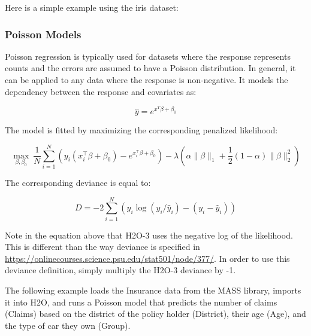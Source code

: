 Here is a simple example using the iris dataset:


\waterExampleInR


\waterExampleInPython



\subsubsection{Poisson Models}
Poisson regression is typically used for datasets where the response represents counts and the errors are assumed to have a Poisson distribution. In general, it can be applied to any data where the response is non-negative. It models the dependency between the response and covariates as: 
\nowidow[3]

$$\hat{y} = e^{x^T\beta + \beta_0}$$

The model is fitted by maximizing the corresponding penalized likelihood:

$$  \max_{\beta,\beta_0}  \ \frac{1}{N} \sum_{i=1}^{N}  \left(   y_i (x_i^{\top}\beta  + \beta_0) - e^{x_i^{\top}\beta  + \beta_0} \right) 
- \lambda \left(\alpha \|\beta \|_1 + \frac{1}{2}(1-\alpha) \| \beta \|_2^2 \right)$$

The corresponding deviance is equal to: 

$$D = -2\sum_{i=1}^{N} \left( y_i \log(y_i/\hat{y}_i) - ( y_i - \hat{y}_i  ) \right)$$

Note in the equation above that H2O-3 uses the negative log of the likelihood. This is different than the way deviance is specified in \url{https://onlinecourses.science.psu.edu/stat501/node/377/}. In order to use this deviance definition, simply multiply the H2O-3 deviance by -1.

The following example loads the Insurance data from the MASS library, imports it into H2O, and runs a Poisson model that predicts the number of claims (Claims) based on the district of the policy holder (District), their age (Age), and the type of car they
own (Group).

\waterExampleInR


\waterExampleInPython


